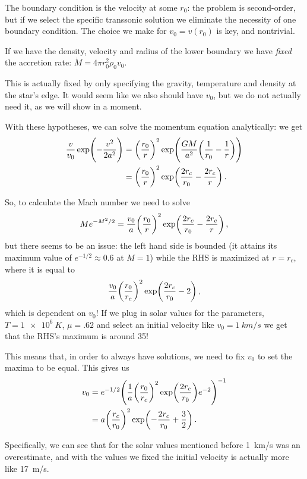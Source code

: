 \documentclass[main.tex]{subfiles}
\begin{document}
The boundary condition is the velocity at some \(r_0 \): the problem is second-order, but if we select the specific transsonic solution we eliminate the necessity of one boundary condition.
The choice we make for \(v_0  = v(r_0)\) is key, and nontrivial.

If we have the density, velocity and radius of the lower boundary we have \emph{fixed} the accretion rate: \(\dot{M}  = 4 \pi r_0^2 \rho_0 v_0 \). 

This is actually fixed by only specifying the gravity, temperature and density at the star's edge. It would seem like we also should have \(v_0 \), but we do not actually need it, as we will show in a moment.

With these hypotheses, we can solve the momentum equation analytically: we get 
%
\begin{align} \label{eq:isothermal-wind-speed-equation}
\frac{v}{v_0 } \exp( -\frac{v^2}{2 a^2}) &= \qty(\frac{r_0}{r})^2 \exp(\frac{GM}{a^2} \qty(\frac{1}{r_0 } - \frac{1}{r}))  \\
&= \qty(\frac{r_0}{r})^2 \exp(\frac{2r_c}{r_0 } - \frac{2r_c}{r})
\,.
\end{align}
%

\begin{bluebox}
So, to calculate the Mach number we need to solve 
%
\begin{align} 
M e^{-M^2/2} = \frac{v_0 }{a} \qty(\frac{r_0 }{r})^2 \exp(\frac{2r_c}{r_0 } - \frac{2 r_c}{r})
\,,
\end{align}
%
but there seems to be an issue: the left hand side is bounded (it attains its maximum value of \(e^{-1/2} \approx 0.6\) at \(M=1\)) while the RHS is maximized at \(r = r_c\), where it is equal to 
%
\begin{align}
\frac{v_0}{a} \qty(\frac{r_0 }{r_c})^2 \exp(\frac{2r_c}{r_0 } - 2)
\,,
\end{align}
%
which is dependent on \(v_0 \)! If we plug in solar values for the parameters, \(T = \SI{1e6}{K}\), \(\mu = \num{.62}\) and select an initial velocity like \(v_0 = \SI{1}{km/s}\) we get that the RHS's maximum is around 35! 

This means that, in order to always have solutions, we need to fix \(v_0 \) to set the maxima to be equal.
This gives us 
%
\begin{align}
v_0 &= e^{-1/2}  \qty(\frac{1}{a} \qty(\frac{r_0}{r_c})^2
\exp(\frac{2 r_c}{r_0 }) e^{-2})^{-1} \\
&= a \qty(\frac{r_c}{r_0 })^2 \exp(-  \frac{2r_c}{r_0 } + \frac{3}{2})
\,.
\end{align}

Specifically, we can see that for the solar values mentioned before \SI{1}{km/s} was an overestimate, and with the values we fixed the initial velocity is actually more like \SI{17}{m/s}.
\end{bluebox}
\end{document}
